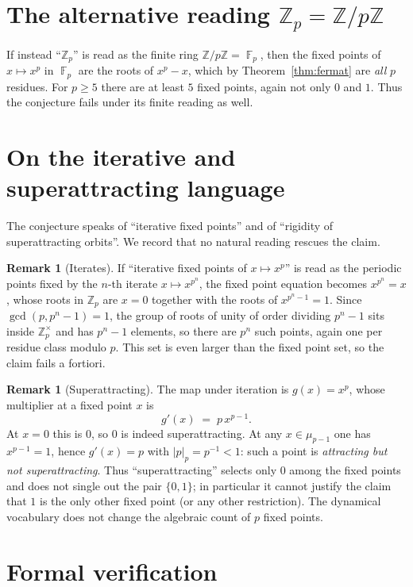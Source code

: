 \documentclass[11pt]{article}
\theoremstyle{definition}
\newtheorem{remark}[theorem]{Remark}
\DeclareMathOperator{\F}{\mathbb{F}}
\newcommand{\Zp}{\mathbb{Z}_p}
\newcommand{\Z}{\mathbb{Z}}
\begin{document}
\section{The alternative reading $\Zp=\Z/p\Z$}

If instead ``$\Zp$'' is read as the finite ring $\Z/p\Z=\F_p$, then the
fixed points of $x\mapsto x^{p}$ in $\F_p$ are the roots of $x^{p}-x$, which by
Theorem~\ref{thm:fermat} are \emph{all} $p$ residues. For $p\ge 5$ there are at
least $5$ fixed points, again not only $0$ and $1$. Thus the conjecture fails
under its finite reading as well.

\section{On the iterative and superattracting language}\label{sec:language}

The conjecture speaks of ``iterative fixed points'' and of ``rigidity of
superattracting orbits''. We record that no natural reading rescues the claim.

\begin{remark}[Iterates]
If ``iterative fixed points of $x\mapsto x^{p}$'' is read as the periodic points
fixed by the $n$-th iterate $x\mapsto x^{p^{n}}$, the fixed point equation becomes
$x^{p^{n}}=x$, whose roots in $\Zp$ are $x=0$ together with the roots of
$x^{p^{n}-1}=1$. Since $\gcd(p,p^{n}-1)=1$, the group of roots of unity of order
dividing $p^{n}-1$ sits inside $\Zp^{\times}$ and has $p^{n}-1$ elements, so
there are $p^{n}$ such points, again one per residue class modulo $p$. This set
is even larger than the fixed point set, so the claim fails a fortiori.
\end{remark}

\begin{remark}[Superattracting]
The map under iteration is $g(x)=x^{p}$, whose multiplier at a fixed point $x$
is
\[
  g'(x) \;=\; p\,x^{p-1}.
\]
At $x=0$ this is $0$, so $0$ is indeed superattracting. At any $x\in\mu_{p-1}$
one has $x^{p-1}=1$, hence $g'(x)=p$ with $|p|_p=p^{-1}<1$: such a point is
\emph{attracting but not superattracting}. Thus ``superattracting'' selects only
$0$ among the fixed points and does not single out the pair $\{0,1\}$; in
particular it cannot justify the claim that $1$ is the only other fixed point
(or any other restriction). The dynamical vocabulary does not change the
algebraic count of $p$ fixed points.
\end{remark}

\section{Formal verification}
\end{document}
